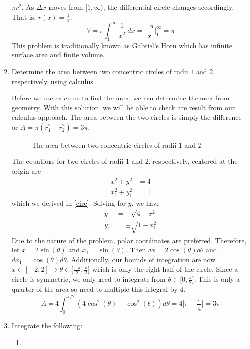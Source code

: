 \begin{enumerate}
  \(\pi r^2\).
  As \(\Delta x\) moves from \([1, \infty)\), the differential circle changes
  accordingly.
  That is, \(r(x) = \frac{1}{x}\).
  \[
  V = \pi\int_1^{\infty}\frac{1}{x^2} \ dx = \frac{-\pi}{x}\bigg|_1^{\infty}
  = \pi
  \]
  This problem is traditionally known as Gabriel's Horn which has infinite
  surface area and finite volume.
\item
  Determine the area between two concentric circles of radii \(1\) and \(2\),
  respectively, using calculus.
  \par\smallskip
  Before we use calculus to find the area, we can determine the area from
  geometry.
  With this solution, we will be able to check are result from our calculus
  approach.
  The area between the two circles is simply the difference or
  \(A = \pi(r_1^2 - r_2^2) = 3\pi\).
  \begin{figure}[H]
    \centering
    
    \caption{The area between two concentric circles of radii \(1\) and \(2\).}
  \end{figure}
  The equations for two circles of radii \(1\) and \(2\), respectively, centered
  at the origin are
  \begin{align*}
    x^2 + y^2 & = 4\\
    x_1^2 + y_1^2 &= 1
  \end{align*}
  which we derived in \cref{circ}.
  Solving for \(y\), we have
  \begin{align*}
    y &= \pm\sqrt{4 - x^2}\\
    y_1 &= \pm\sqrt{1 - x_1^2}
  \end{align*}
  Due to the nature of the problem, polar coordinates are preferred.
  Therefore, let \(x = 2\sin(\theta)\) and \(x_1 = \sin(\theta)\).
  Then \(dx = 2\cos(\theta)d\theta\) and \(dx_1 = \cos(\theta)d\theta\).
  Additionally, our bounds of integration are now
  \(x\in[-2, 2]\to\theta\in\big[\frac{-\pi}{2}, \frac{\pi}{2}\big]\) which is
  only the right half of the circle.
  Since a circle is symmetric, we only need to integrate from
  \(\theta\in\big[0, \frac{\pi}{2}\big]\).
  This is only a quarter of the area so need to multiple this integral by \(4\).
  \[
  A = 4\int_0^{\pi/2}(4\cos^2(\theta) - \cos^2(\theta))d\theta =
  4\bigg[\pi - \frac{\pi}{4}\bigg] = 3\pi
  \]
\item
  Integrate the following:
  \begin{enumerate}[label = (\alph*), ref = \theenumi{(\alph*)}]
  \item
    \label{20a}

\end{enumerate}
\end{enumerate}

